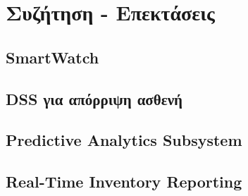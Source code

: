 \chapter{Συζήτηση - Επεκτάσεις}\label{ch:Discussion}
\section{SmartWatch}
\section{DSS για απόρριψη ασθενή}
\section{Predictive Analytics Subsystem}
\section{Real-Time Inventory Reporting}
